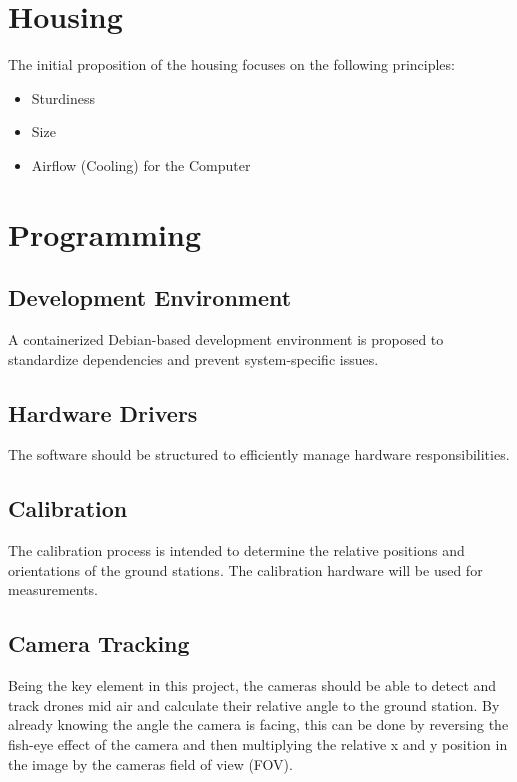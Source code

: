 \section{Housing}

The initial proposition of the housing focuses on the following principles:
\begin{itemize}
	\item Sturdiness
	\item Size
	\item Airflow (Cooling) for the Computer
\end{itemize}


\section{Programming}

\subsection{Development Environment}

A containerized Debian-based development environment is proposed to standardize dependencies and prevent system-specific issues.

\subsection{Hardware Drivers}

The software should be structured to efficiently manage hardware responsibilities.

\subsection{Calibration}

The calibration process is intended to determine the relative positions and orientations of the ground stations. The calibration hardware will be used for measurements.

\subsection{Camera Tracking}
Being the key element in this project, the cameras should be able to detect and track drones mid air and calculate their relative angle to the ground station. By already knowing the angle the camera is facing, this can be done by reversing the fish-eye effect of the camera and then multiplying the relative x and y position in the image by the cameras field of view (FOV).

